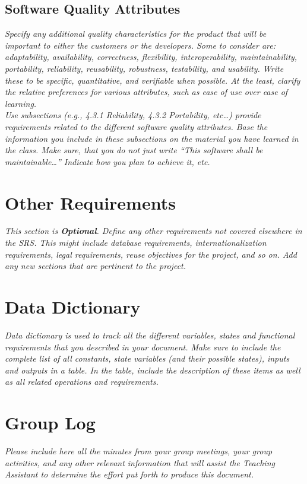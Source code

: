 \documentclass[12pt]{article}
\newcommand{\gnl}{\vspace{1em}\\}      %
\begin{document}
    \subsection{Software Quality Attributes}
        \emph{Specify any additional quality characteristics for the product that will be important to either the customers or the developers. Some to consider are: adaptability, availability, correctness, flexibility, interoperability, maintainability, portability, reliability, reusability, robustness, testability, and usability. Write these to be specific, quantitative, and verifiable when possible. At the least, clarify the relative preferences for various attributes, such as ease of use over ease of learning.\gnl Use subsections (e.g., 4.3.1 Reliability, 4.3.2 Portability, etc\dots) provide requirements related to the different software quality attributes. Base the information you include in these subsections on the material you have learned in the class. Make sure, that you do not just write “This software shall be maintainable…” Indicate how you plan to achieve it, etc.}

\pagebreak
\section{Other Requirements}
    \emph{This section is \textbf{Optional}. Define any other requirements not covered elsewhere in the SRS. This might include database requirements, internationalization requirements, legal requirements, reuse objectives for the project, and so on. Add any new sections that are pertinent to the project.}

\pagebreak
\appendix

\section{Data Dictionary}
    \emph{Data dictionary is used to track all the different variables, states and functional requirements that you described in your document. Make sure to include the complete list of all constants, state variables (and their possible states), inputs and outputs in a table. In the table, include the description of these items as well as all related operations and requirements.}

\pagebreak
\section{Group Log}
    \emph{Please include here all the minutes from your group meetings, your group activities, and any other relevant information that will assist the Teaching Assistant to determine the effort put forth to produce this document.}
\end{document}
